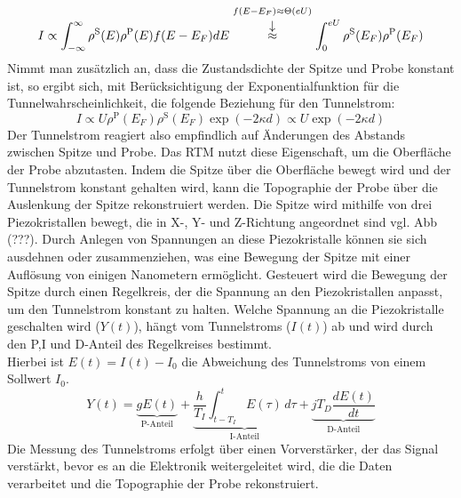 \documentclass{article}
\begin{document}
\begin{equation}
    I \propto \int_{-\infty}^{\infty} \rho^{\text{S}}(E) \rho^{\text{P}}(E) f(E - E_F) dE \drueber{f(E-E_F) \approx \Theta(eU)}{\approx} \int_{0}^{eU}\rho^{\text{S}}(E_F) \rho^{\text{P}}(E_F)
\end{equation}
Nimmt man zusätzlich an, dass die Zustandsdichte der Spitze und Probe konstant ist, so ergibt sich, mit Berücksichtigung der Exponentialfunktion für die Tunnelwahrscheinlichkeit, die folgende Beziehung für den Tunnelstrom:
\begin{equation}
    I \propto U \rho^{\text{P}}(E_F) \rho^{\text{S}}(E_F) \exp(-2\kappa d) \propto U \exp(-2\kappa d)
\end{equation}
Der Tunnelstrom reagiert also empfindlich auf Änderungen des Abstands zwischen Spitze und Probe. Das RTM nutzt diese Eigenschaft, um die Oberfläche der Probe abzutasten. 
Indem die Spitze über die Oberfläche bewegt wird und der Tunnelstrom konstant gehalten wird, kann die Topographie der Probe über die Auslenkung der Spitze rekonstruiert werden.
Die Spitze wird mithilfe von drei Piezokristallen bewegt, die in X-, Y- und Z-Richtung angeordnet sind vgl. Abb (???). Durch Anlegen von Spannungen an diese Piezokristalle können sie sich ausdehnen oder zusammenziehen, was eine Bewegung der Spitze mit einer Auflösung von einigen Nanometern ermöglicht.
Gesteuert wird die Bewegung der Spitze durch einen Regelkreis, der die Spannung an den Piezokristallen anpasst, um den Tunnelstrom konstant zu halten. 
Welche Spannung an die Piezokristalle geschalten wird ($Y(t)$), hängt vom Tunnelstroms ($I(t)$) ab und wird durch den P,I und D-Anteil des Regelkreises bestimmt.\\
Hierbei ist $E(t) = I(t) - I_0$ die Abweichung des Tunnelstroms von einem Sollwert $I_0$.
\[
Y(t) = \underbrace{gE(t)}_{\text{P-Anteil}} + \underbrace{\frac{h}{T_I} \int_{t - T_I}^{t} E(\tau)\, d\tau}_{\text{I-Anteil}} + \underbrace{j T_D \frac{dE(t)}{dt}}_{\text{D-Anteil}}
\]
Die Messung des Tunnelstroms erfolgt über einen Vorverstärker, der das Signal verstärkt, bevor es an die Elektronik weitergeleitet wird, die die Daten verarbeitet und die Topographie der Probe rekonstruiert.
\end{document}
